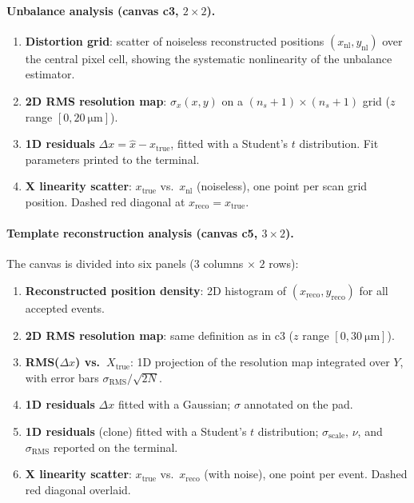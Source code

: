 \documentclass[preprint,numbers,1p]{elsarticle}
\begin{document}
\paragraph{Unbalance analysis (canvas c3, $2\times2$).}
\begin{enumerate}
  \item[P1] \textbf{Distortion grid}: scatter of noiseless reconstructed positions
        $(x_\mathrm{nl}, y_\mathrm{nl})$ over the central pixel cell, showing the systematic
        nonlinearity of the unbalance estimator.
  \item[P2] \textbf{2D RMS resolution map}: $\sigma_x(x,y)$ on a $(n_s+1)\times(n_s+1)$ grid ($z$ range
        $[0, \SI{20}{\micro\meter}]$).
  \item[P3] \textbf{1D residuals} $\Delta x = \hat{x} - x_\mathrm{true}$, fitted with a
        Student's $t$ distribution. Fit parameters printed to the terminal.
  \item[P4] \textbf{X linearity scatter}: $x_\mathrm{true}$ vs.\ $x_\mathrm{nl}$ (noiseless),
        one point per scan grid position. Dashed red diagonal at $x_\mathrm{reco}=x_\mathrm{true}$.
\end{enumerate}

\paragraph{Template reconstruction analysis (canvas c5, $3\times2$).}
The canvas is divided into six panels ($3$ columns $\times$ $2$ rows):
\begin{enumerate}
  \item[P1] \textbf{Reconstructed position density}: 2D histogram of $(x_\mathrm{reco},
        y_\mathrm{reco})$ for all accepted events.
  \item[P2] \textbf{2D RMS resolution map}: same definition as in c3 ($z$ range
        $[0, \SI{30}{\micro\meter}]$).
  \item[P3] \textbf{RMS($\Delta x$) vs.\ $X_\mathrm{true}$}: 1D projection of the resolution
        map integrated over $Y$, with error bars $\sigma_\mathrm{RMS}/\sqrt{2N}$.
  \item[P4] \textbf{1D residuals} $\Delta x$ fitted with a Gaussian; $\sigma$ annotated on
        the pad.
  \item[P5] \textbf{1D residuals} (clone) fitted with a Student's $t$ distribution;
        $\sigma_\mathrm{scale}$, $\nu$, and $\sigma_\mathrm{RMS}$ reported on the terminal.
  \item[P6] \textbf{X linearity scatter}: $x_\mathrm{true}$ vs.\ $x_\mathrm{reco}$ (with
        noise), one point per event. Dashed red diagonal overlaid.
\end{enumerate}
\end{document}
